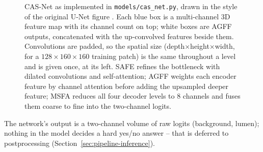 \begin{figure}[htbp]
{%
  }
  \caption{CAS-Net \cite{dong2023casnet} as implemented in \texttt{models/cas\_net.py}, drawn in the
    style of the original U-Net figure \cite{ronneberger2015unet}. Each blue box is a multi-channel
    3D feature map with its channel count on top; white boxes are AGFF outputs, concatenated with
    the up-convolved features beside them. Convolutions are padded, so the spatial size
    (depth$\times$height$\times$width, for a $128\times160\times160$ training patch) is the same
    throughout a level and is given once, at its left. SAFE refines the bottleneck with dilated
    convolutions and self-attention; AGFF weights each encoder feature by channel attention before
    adding the upsampled deeper feature; MSFA reduces all four decoder levels to 8 channels and
    fuses them coarse to fine into the two-channel logits.}
  \label{fig:pipeline-casnet}
\end{figure}

The network's output is a two-channel volume of raw logits (background, lumen); nothing in the
model decides a hard yes/no answer -- that is deferred to postprocessing
(Section~\ref{sec:pipeline-inference}).
